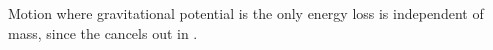 \begin{problem}[A1987PIQ5a]
{ Motion where gravitational potential is the only energy loss is independent of mass, since the  cancels out in .
}
\end{problem}